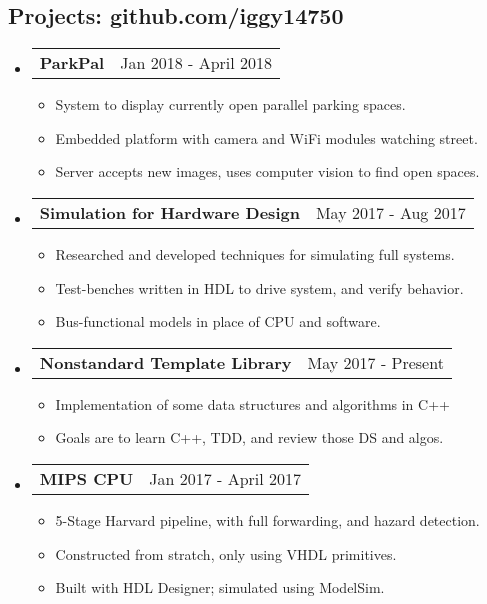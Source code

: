 \documentclass[18pt]{article}
\makeatletter
\providecommand{\tightlist}{
    \setlength{\itemsep}{0pt}\setlength{\parskip}{0pt}
}
\providecommand{\datetable}[2]{
    \begin{tabular*}{\textwidth}{@{}r @{\extracolsep{\fill}} l}
        #1 & #2
    \end{tabular*}
}
\makeatother
\begin{document}
    \subsection*{Projects: github.com/iggy14750}\label{projects}
    \begin{itemize}[label={}]\tightlist
        
        \item \datetable{\textbf{ParkPal}}{Jan 2018 - April 2018}
        \begin{itemize}\tightlist
            \item System to display currently open parallel parking spaces.
            \item Embedded platform with camera and WiFi modules watching street.
            \item Server accepts new images, uses computer vision to find open spaces.
        \end{itemize}

        \item \datetable{\textbf{Simulation for Hardware Design}}
        {May 2017 - Aug 2017}
        \begin{itemize}\tightlist
            \item Researched and developed techniques for simulating full systems.
            \item Test-benches written in HDL to drive system, and verify behavior.
            \item Bus-functional models in place of CPU and software.
        \end{itemize}
        
        \item \datetable{\textbf{Nonstandard Template Library}}
        {May 2017 - Present}
        \begin{itemize}\tightlist
            \item Implementation of some data structures and algorithms in C++
            \item Goals are to learn C++, TDD, and review those DS and algos.
        \end{itemize}
            
        \item \datetable{\textbf{MIPS CPU}}{Jan 2017 - April 2017}
        \begin{itemize}\tightlist
            \item 5-Stage Harvard pipeline, with full forwarding, and hazard detection.
            \item Constructed from stratch, only using VHDL primitives.
            \item Built with HDL Designer; simulated using ModelSim.
        \end{itemize}
      

\end{itemize}
\end{document}
